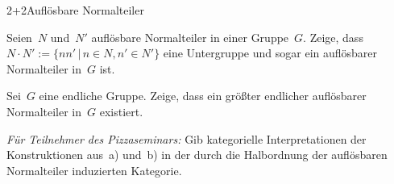 \documentclass{algblatt}
\begin{document}
\begin{aufgabeE}{2+2}{Auflösbare Normalteiler}
\item Seien~$N$ und~$N'$ auflösbare Normalteiler in einer Gruppe~$G$. Zeige,
dass~$N \cdot N' := \{ n n' \,|\, n \in N, n' \in N' \}$ eine Untergruppe und
sogar ein auflösbarer Normalteiler in~$G$ ist.
\item Sei~$G$ eine endliche Gruppe. Zeige, dass ein größter endlicher
auflösbarer Normalteiler in~$G$ existiert.
\tiny
\item \emph{Für Teilnehmer des Pizzaseminars:} Gib kategorielle
Interpretationen der Konstruktionen aus~a) und~b) in der durch die Halbordnung
der auflösbaren Normalteiler induzierten Kategorie.
\end{aufgabeE}
\end{document}
